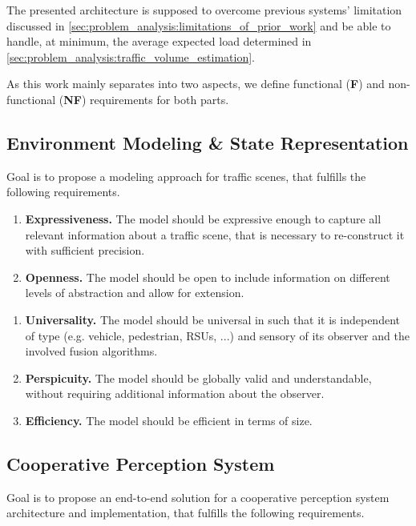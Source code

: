 The presented architecture is supposed to overcome previous systems' limitation discussed in \cref{sec:problem_analysis:limitations_of_prior_work} and be able to handle, at minimum, the average expected load determined in \cref{sec:problem_analysis:traffic_volume_estimation}.

As this work mainly separates into two aspects, we define functional (\textbf{F}) and non-functional (\textbf{NF}) requirements for both parts.

\subsection{Environment Modeling \& State Representation}
\label{subsec:problem_analysis:environment_modeling_state_representation}

Goal is to propose a modeling approach for traffic scenes, that fulfills the following requirements. 

\begin{enumerate}[F-M1:\ \ ]
	\item \textbf{Expressiveness.} The model should be expressive enough to capture all relevant information about a traffic scene, that is necessary to re-construct it with sufficient precision.
	\item \textbf{Openness.} The model should be open to include information on different levels of abstraction and allow for extension.
\end{enumerate}
\begin{enumerate}[NF-M1:]
	\item \textbf{Universality.} The model should be universal in such that it is independent of type (e.g. vehicle, pedestrian, RSUs, ...) and sensory of its observer and the involved fusion algorithms.
	\item \textbf{Perspicuity.} The model should be globally valid and understandable, without requiring additional information about the observer.
	\item \textbf{Efficiency.} The model should be efficient in terms of size.
\end{enumerate}

\subsection{Cooperative Perception System}
\label{subsec:problem_analysis:cooperative_perception_system}

Goal is to propose an end-to-end solution for a cooperative perception system architecture and implementation, that fulfills the following requirements. 

